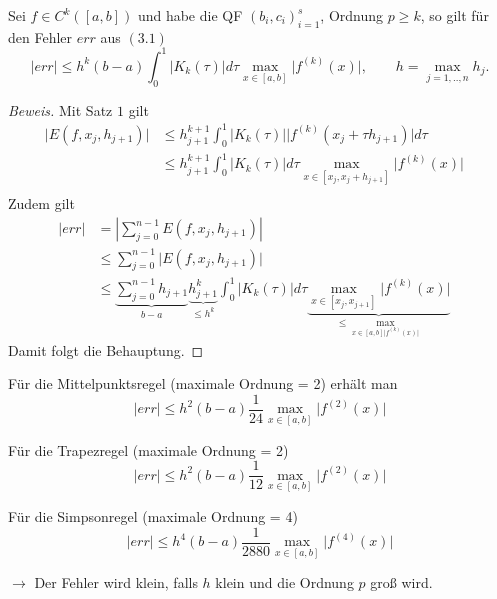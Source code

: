 \begin{nothing}
\begin{description}
    \item[Satz 3:] 
      Sei $f \in C^k([a,b])$ und habe die QF $(b_i, c_i)^s_{i=1}$, Ordnung $p \geq k$, so gilt für den Fehler $err$ aus $(3.1)$ 
      $$ \vert err \vert \leq h^k (b-a) \int_0^1 \vert K_k(\tau) \vert d\tau \max_{x \in [a,b]} \vert f^{(k)}(x) \vert, \quad \quad h = \max_{j=1,..,n} h_j.$$
    
    \item \begin{proof}[Beweis]
      Mit Satz $1$ gilt 
      \begin{align*}
      \vert E(f, x_j, h_{j+1}) \vert &\leq h_{j+1}^{k+1} \int_0^1 \vert K_k(\tau) \vert \vert f^{(k)}(x_j+\tau h_{j+1}) \vert d\tau&\\
      &\leq h_{j+1}^{k+1} \int_0^1 \vert K_k(\tau) \vert d\tau \max_{x \in [x_j, x_j + h_{j+1}]} \vert f^{(k)}(x) \vert&\\
      \end{align*}
      Zudem gilt 
      \begin{align*} 
      \vert err \vert &= \left\vert \sum_{j=0}^{n-1} E(f, x_j, h_{j+1}) \right\vert &\\
      &\leq \sum_{j=0}^{n-1} \vert E(f, x_j, h_{j+1}) \vert &\\
      &\leq \underbrace{\sum_{j=0}^{n-1} h_{j+1}}_{b-a} \underbrace{h_{j+1}^k}_{\leq h^k} \int_0^1 \vert K_k(\tau) \vert d\tau \underbrace{\max_{x \in [x_j, x_{j+1}]} \vert f^{(k)} (x) \vert}_{\leq \max_{x\in[a,b] \vert f^{(k)}(x) \vert}}
      \end{align*}
      Damit folgt die Behauptung.
    \end{proof}
    
    \item[Beispiele]
      \begin{description}\item\end{description}
      \begin{description}
        \item Für die Mittelpunktsregel (maximale Ordnung = 2) erhält man
      		$$ \vert err \vert \leq h^2 (b-a) \frac{1}{24} \max_{x\in[a,b]} \vert f^{(2)}(x) \vert $$ 
      	\item Für die Trapezregel (maximale Ordnung = 2)
      		$$ \vert err \vert \leq h^2 (b-a) \frac{1}{12} \max_{x\in[a,b]} \vert f^{(2)}(x) \vert $$  
      	\item Für die Simpsonregel (maximale Ordnung = 4)
      		$$ \vert err \vert \leq h^4 (b-a) \frac{1}{2880} \max_{x\in[a,b]} \vert f^{(4)}(x) \vert $$ 
	  \end{description}
      $\rightarrow$ Der Fehler wird klein, falls $h$ klein und die Ordnung $p$ groß wird.
\end{description}
\end{nothing}